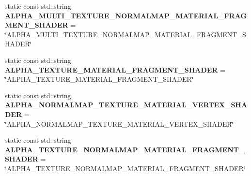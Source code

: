 \begin{DoxyCompactItemize}
\item 
\mbox{\label{struct_geometry_engine_1_1_geometry_material_1_1_material_constants_a396e9b6226bf3d39292ff258f4a21dd6}} 
static const std\+::string {\bfseries A\+L\+P\+H\+A\+\_\+\+M\+U\+L\+T\+I\+\_\+\+T\+E\+X\+T\+U\+R\+E\+\_\+\+N\+O\+R\+M\+A\+L\+M\+A\+P\+\_\+\+M\+A\+T\+E\+R\+I\+A\+L\+\_\+\+F\+R\+A\+G\+M\+E\+N\+T\+\_\+\+S\+H\+A\+D\+ER} = \char`\"{}A\+L\+P\+H\+A\+\_\+\+M\+U\+L\+T\+I\+\_\+\+T\+E\+X\+T\+U\+R\+E\+\_\+\+N\+O\+R\+M\+A\+L\+M\+A\+P\+\_\+\+M\+A\+T\+E\+R\+I\+A\+L\+\_\+\+F\+R\+A\+G\+M\+E\+N\+T\+\_\+\+S\+H\+A\+D\+ER\char`\"{}
\item 
\mbox{\label{struct_geometry_engine_1_1_geometry_material_1_1_material_constants_a468dcad63ab799f9999a57a204ea34aa}} 
static const std\+::string {\bfseries A\+L\+P\+H\+A\+\_\+\+T\+E\+X\+T\+U\+R\+E\+\_\+\+M\+A\+T\+E\+R\+I\+A\+L\+\_\+\+F\+R\+A\+G\+M\+E\+N\+T\+\_\+\+S\+H\+A\+D\+ER} = \char`\"{}A\+L\+P\+H\+A\+\_\+\+T\+E\+X\+T\+U\+R\+E\+\_\+\+M\+A\+T\+E\+R\+I\+A\+L\+\_\+\+F\+R\+A\+G\+M\+E\+N\+T\+\_\+\+S\+H\+A\+D\+ER\char`\"{}
\item 
\mbox{\label{struct_geometry_engine_1_1_geometry_material_1_1_material_constants_a8d1eb075b0fd06c668984e2ccc8ef35d}} 
static const std\+::string {\bfseries A\+L\+P\+H\+A\+\_\+\+N\+O\+R\+M\+A\+L\+M\+A\+P\+\_\+\+T\+E\+X\+T\+U\+R\+E\+\_\+\+M\+A\+T\+E\+R\+I\+A\+L\+\_\+\+V\+E\+R\+T\+E\+X\+\_\+\+S\+H\+A\+D\+ER} = \char`\"{}A\+L\+P\+H\+A\+\_\+\+N\+O\+R\+M\+A\+L\+M\+A\+P\+\_\+\+T\+E\+X\+T\+U\+R\+E\+\_\+\+M\+A\+T\+E\+R\+I\+A\+L\+\_\+\+V\+E\+R\+T\+E\+X\+\_\+\+S\+H\+A\+D\+ER\char`\"{}
\item 
\mbox{\label{struct_geometry_engine_1_1_geometry_material_1_1_material_constants_a9ebc668f57ba1b8bf8ffdd8a0582386f}} 
static const std\+::string {\bfseries A\+L\+P\+H\+A\+\_\+\+T\+E\+X\+T\+U\+R\+E\+\_\+\+N\+O\+R\+M\+A\+L\+M\+A\+P\+\_\+\+M\+A\+T\+E\+R\+I\+A\+L\+\_\+\+F\+R\+A\+G\+M\+E\+N\+T\+\_\+\+S\+H\+A\+D\+ER} = \char`\"{}A\+L\+P\+H\+A\+\_\+\+T\+E\+X\+T\+U\+R\+E\+\_\+\+N\+O\+R\+M\+A\+L\+M\+A\+P\+\_\+\+M\+A\+T\+E\+R\+I\+A\+L\+\_\+\+F\+R\+A\+G\+M\+E\+N\+T\+\_\+\+S\+H\+A\+D\+ER\char`\"{}
\item 

\end{DoxyCompactItemize}
